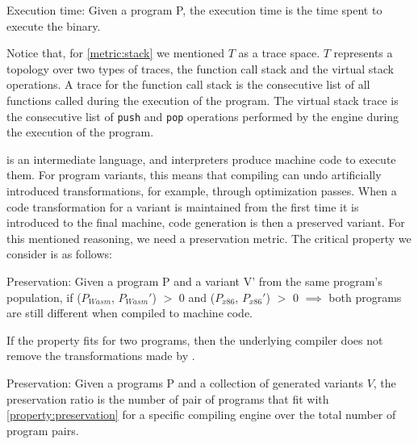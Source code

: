 \begin{metric}{Execution time:}\label{metric:time}
	Given a \wasm program P, the execution time is the time spent to execute the binary.
\end{metric}

Notice that, for \autoref{metric:stack} we mentioned $T$ as a trace space. $T$ represents a topology over two types of traces, the function call stack and the virtual stack operations. A trace for the function call stack is the consecutive list of all functions called during the execution of the \wasm program. The virtual stack trace is the consecutive list of \texttt{push} and \texttt{pop} operations performed by the \wasm engine during the execution of the program.



\wasm is an intermediate language, and interpreters produce machine code to execute them. For program variants, this means that compiling can undo artificially introduced transformations, for example, through optimization passes. When a code transformation for a variant is maintained from the first time it is introduced to the final machine, code generation is then a preserved variant. For this mentioned reasoning, we need a preservation metric. The critical property we consider is as follows:



\begin{property}{Preservation:}
	\label{property:preservation}
	Given a program P and a variant V' from the same program's population, if \DTWStatic{}($P_{Wasm}$, $P_{Wasm}'$) $>$ 0 and \DTWStatic{}($P_{x86}$, $P_{x86}'$) $>$ 0 $\implies$  both programs are still different when compiled to machine code.
	
	If the property fits for two programs, then the underlying compiler does not remove the transformations made by \tool. 
\end{property}


\begin{metric}{Preservation:}\label{metric:preservation}
	Given a \wasm programs P and a collection of generated variants $V$, the preservation ratio is the number of pair of programs that fit with \autoref{property:preservation} for a specific compiling engine over the total number of program pairs.
\end{metric}

